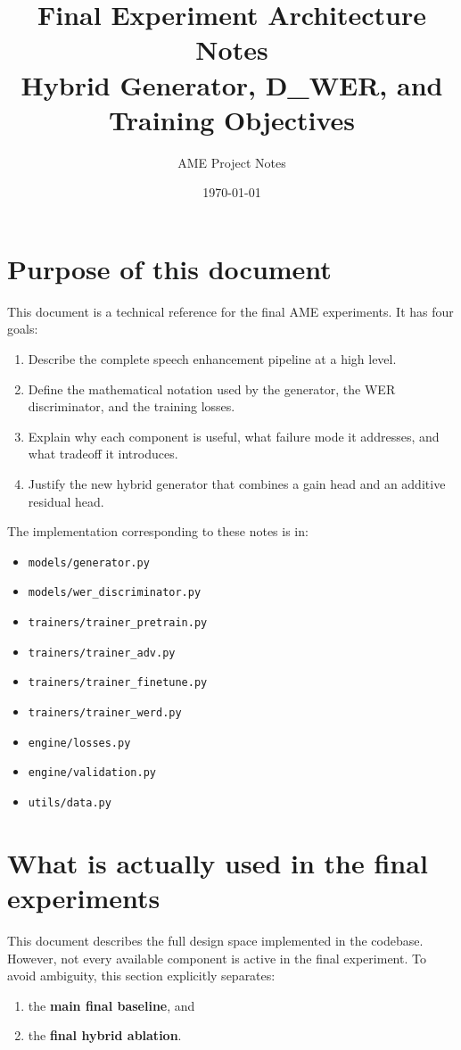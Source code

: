 \documentclass[11pt]{article}
\title{Final Experiment Architecture Notes\\Hybrid Generator, D\_WER, and Training Objectives}
\author{AME Project Notes}
\date{\today}
\begin{document}
\maketitle
\tableofcontents
\newpage

\section{Purpose of this document}
This document is a technical reference for the final AME experiments. It has four goals:
\begin{enumerate}[leftmargin=*]
    \item Describe the complete speech enhancement pipeline at a high level.
    \item Define the mathematical notation used by the generator, the WER discriminator, and the training losses.
    \item Explain why each component is useful, what failure mode it addresses, and what tradeoff it introduces.
    \item Justify the new hybrid generator that combines a gain head and an additive residual head.
\end{enumerate}

The implementation corresponding to these notes is in:
\begin{itemize}[leftmargin=*]
    \item \texttt{models/generator.py}
    \item \texttt{models/wer\_discriminator.py}
    \item \texttt{trainers/trainer\_pretrain.py}
    \item \texttt{trainers/trainer\_adv.py}
    \item \texttt{trainers/trainer\_finetune.py}
    \item \texttt{trainers/trainer\_werd.py}
    \item \texttt{engine/losses.py}
    \item \texttt{engine/validation.py}
    \item \texttt{utils/data.py}
\end{itemize}

\section{What is actually used in the final experiments}
This document describes the full design space implemented in the codebase. However, not every available component is active in the final experiment. To avoid ambiguity, this section explicitly separates:
\begin{enumerate}[leftmargin=*]
    \item the \textbf{main final baseline}, and
    \item the \textbf{final hybrid ablation}.
\end{enumerate}
\end{document}
